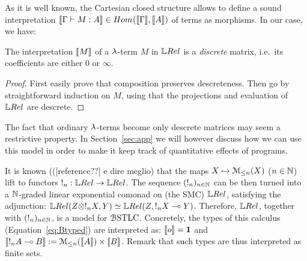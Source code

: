 As it is well known, the Cartesian closed structure %
allows to define a sound interpretation $\model{\Gamma\vdash M:A}\in\HOM{}{\model \Gamma}{\model A}$ of terms as morphisms.
In our case, we have:

\begin{proposition}\label{prop:descrete}
 The interpretation $\llbracket M\rrbracket$ of a $\lambda$-term $M$ in $\LREL$ is a \emph{discrete} matrix, i.e.\ its coefficients are either $0$ or $\infty$.
\end{proposition}
\begin{proof}
 First easily prove that composition preserves descreteness.
 Then go by straightforward induction on $M$, using that the projections and evaluation of  $\LREL$ are descrete.
\end{proof}

The fact that ordinary $\lambda$-terms become only descrete matrices may seem a restrictive property.
In Section~\ref{sec:app} we will however discuss how we can use this model in order to make it keep track of quantitative effects of programs.

\begin{remark}\label{rmk:ModelsOfBSTLC}
It is known {\color{red}(([reference??] e dire meglio)} that the maps $X\mapsto \mathcal{M}_{\leq n}(X)$ ($n\in\mathbb{N}$) lift to functors $!_n:\LREL\to\LREL$.
The sequence $(!_n)_{n\in\mathbb{N}}$ can be then turned into a $\mathbb{N}$-graded linear exponential comonad on (the SMC) $\LREL$, satisfying the adjunction:
$\LREL(Z\otimes !_{n}X,Y) \simeq \LREL(Z, !_{n}X\multimap Y)$.
Therefore, $\LREL$, together with $(!_n)_{n\in\mathbb{N}}$, is a model for $\mathcal{B}\mathrm{STLC}$. 
Concretely, the types of this calculus (Equation~\ref{eq:Btyped}) are interpreted as: $\llbracket o\rrbracket=\mathbf{1}$ and 
$\llbracket!_{n}A\multimap B\rrbracket:= \mathcal{M}_{\leq n}(\llbracket A\rrbracket) \times \llbracket B\rrbracket$.
Remark that such types are thus interpreted as finite sets.
\end{remark}



